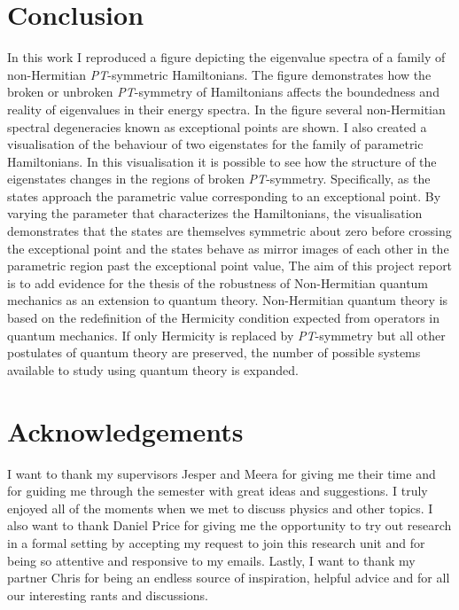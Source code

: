 \documentclass[10pt, a4paper, singlespacing]{report}
\newcommand\PT{\emph{PT}}
\begin{document}
\chapter{Conclusion}\label{Conclusion}
 In this work I reproduced a figure depicting the eigenvalue spectra of a family of non-Hermitian \PT-symmetric Hamiltonians. The figure demonstrates how the broken or unbroken \PT-symmetry of Hamiltonians affects the boundedness and reality of eigenvalues in their energy spectra. In the figure several non-Hermitian spectral degeneracies known as exceptional points are shown. I also created a visualisation of the behaviour of two eigenstates for the family of parametric Hamiltonians. In this visualisation it is possible to see how the structure of the eigenstates changes in the regions of broken \PT-symmetry. Specifically, as the states approach the parametric value corresponding to an exceptional point. By varying the parameter that characterizes the Hamiltonians, the visualisation demonstrates that the states are themselves symmetric about zero before crossing the exceptional point and the states behave as mirror images of each other in the parametric region past the exceptional point value, The aim of this project report is to add evidence for the thesis of the robustness of Non-Hermitian quantum mechanics as an extension to quantum theory. Non-Hermitian quantum theory is based on the redefinition of the Hermicity condition expected from operators in quantum mechanics. If only Hermicity is replaced by \PT-symmetry but all other postulates of quantum theory are preserved, the number of possible systems available to study using quantum theory is expanded.

\chapter{Acknowledgements}\label{Acknowledgements}
I want to thank my supervisors Jesper and Meera for giving me their time and for guiding me through the semester with great ideas and suggestions. I truly enjoyed all of the moments when we met to discuss physics and other topics. I also want to thank Daniel Price for giving me the opportunity to try out research in a formal setting by accepting my request to join this research unit and for being so attentive and responsive to my emails. Lastly, I want to thank my partner Chris for being an endless source of inspiration, helpful advice and for all our interesting rants and discussions. 
\end{document}
